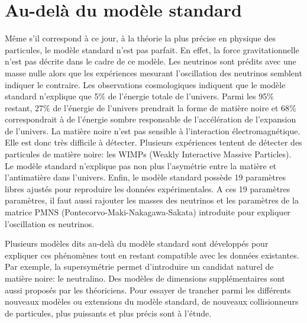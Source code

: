 \section{Au-delà du modèle standard}
Même s'il correspond à ce jour, à la théorie la plus précise en physique des particules, le modèle standard n'est pas parfait. En effet, la force gravitationnelle n'est pas décrite dans le cadre de ce modèle. Les neutrinos sont prédits avec une masse nulle alors que les expériences mesurant l'oscillation des neutrinos semblent indiquer le contraire. Les observations cosmologiques indiquent que le modèle standard n'explique que 5$\%$ de l'énergie totale de l'univers. Parmi les 95$\%$ restant, 27$\%$ de l'énergie de l'univers prendrait la forme de matière noire et 68$\%$ correspondrait à de l'énergie sombre responsable de l'accélération de l'expansion de l'univers. La matière noire n'est pas sensible à l'interaction électromagnétique. Elle est donc très difficile à détecter. Plusieurs expériences tentent de détecter des particules de matière noire: les WIMPs (Weakly Interactive Massive Particles). Le modèle standard n'explique pas non plus l'asymétrie entre la matière et l'antimatière dans l'univers. Enfin, le modèle standard possède 19 paramètres libres ajustés pour reproduire les données expérimentales. A ces 19 paramètres paramètres, il faut aussi rajouter les masses des neutrinos et les paramètres de la matrice PMNS (Pontecorvo-Maki-Nakagawa-Sakata) introduite pour expliquer l'oscillation es neutrinos.

Plusieurs modèles dits au-delà du modèle standard sont développés pour expliquer ces phénomènes tout en restant compatible avec les données existantes. Par exemple, la supersymétrie permet d'introduire un candidat naturel de matière noire: le neutralino. Des modèles de dimensions supplémentaires sont aussi proposés par les théoriciens. Pour essayer de trancher parmi les différents nouveaux modèles ou extensions du modèle standard, de nouveaux collisionneurs de particules, plus puissants et plus précis sont à l'étude.
